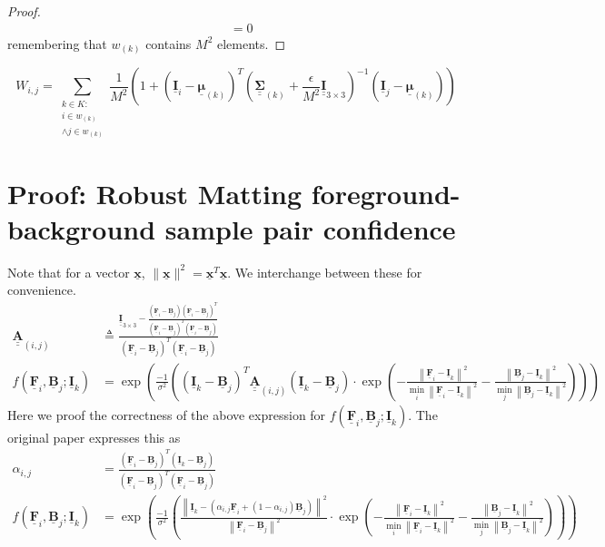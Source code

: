 \documentclass{article}
\def\vt#1{\underline{\mathbf{#1}}}
\def\vts#1{\underline{\boldsymbol{#1}}}
\def\mt#1{\underline{\underline{\mathbf{#1}}}}
\def\mts#1{\underline{\underline{\boldsymbol{#1}}}}
\begin{document}
\begin{lemma}
\begin{proof}
\begin{align*}
            &= 0
        \end{align*}
        remembering that $w_{(k)}$ contains $M^2$ elements.
    \end{proof}
\end{lemma}



$$W_{i,j} = \sum_{\substack{k\in K:\\i\in w_{(k)}\\\wedge j\in w_{(k)}}} \frac1{M^2}\left(1 + \left(\vt{I}_i - \vts \mu_{(k)}\right)^T \left(\mts \Sigma_{(k)} + \frac\epsilon{M^2} \mt{I}_{3\times 3}\right)^{-1} \left(\vt{I}_j - \vts \mu_{(k)}\right) \right)$$

\section{Proof: Robust Matting foreground-background sample pair confidence} \label{appendix:robust-confidence}
Note that for a vector $\vt x$, $\|\vt x\|^2 = \vt x^T\vt x$. We interchange between these for convenience.
\begin{align*}
    \mt A_{(i,j)} &\triangleq \frac{\mt I_{3\times 3} -  \frac{\left(\vt F_i - \vt B_j\right)\left(\vt F_i - \vt B_j\right)^T}{\left(\vt F_i - \vt B_j\right)^T\left(\vt F_i - \vt B_j\right)}}{\left(\vt F_i - \vt B_j\right)^T\left(\vt F_i - \vt B_j\right)} \\
    f(\vt F_i, \vt B_j; \vt I_k) &= \exp\left(\frac{-1}{\sigma^2} \left(
        \left(\vt I_k - \vt B_j \right)^T \mt A_{(i,j)}\left(\vt I_k - \vt B_j \right) \cdot \exp\left(  -\frac{\left\| \vt F_i - \vt I_k \right\|^2}{\min_i \left\| \vt F_i - \vt I_k \right\|^2} - \frac{\left\| \vt B_j - \vt I_k \right\|^2}{\min_j \left\| \vt B_j - \vt I_k \right\|^2} \right)
        \right)\right)
\end{align*}
Here we proof the correctness of the above expression for $f(\vt F_i, \vt B_j; \vt I_k)$. The original paper expresses this as
\begin{align*}
    \alpha_{i,j} &= \frac{\left(\vt F_i - \vt B_j\right)^T\left(\vt I_k - \vt B_j\right)}{\left(\vt F_i - \vt B_j\right)^T\left(\vt F_i - \vt B_j\right)} \\
    f(\vt F_i, \vt B_j; \vt I_k) &= \exp\left(\frac{-1}{\sigma^2} \left(
        \frac{\left\| \vt I_k - \left( \alpha_{i,j}\vt F_i + (1-\alpha_{i,j})\vt B_j\right)  \right\|^2}{\left\| \vt F_i - \vt B_j \right\|^2} \cdot \exp\left(  -\frac{\left\| \vt F_i - \vt I_k \right\|^2}{\min_i \left\| \vt F_i - \vt I_k \right\|^2} - \frac{\left\| \vt B_j - \vt I_k \right\|^2}{\min_j \left\| \vt B_j - \vt I_k \right\|^2} \right)
    \right)\right)
\end{align*}
\end{document}
